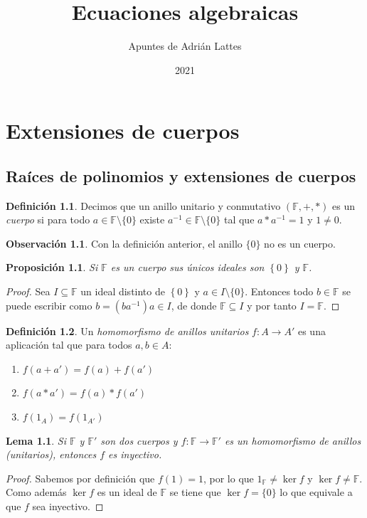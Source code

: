 \documentclass[10pt, spanish]{report}
\title{Ecuaciones algebraicas}
\author{Apuntes de Adrián Lattes}
\date{2021}
\newtheorem{lema}[tma]{Lema}
\newtheorem{prop}[tma]{Proposición}
\theoremstyle{definition}
\newtheorem*{defin}{Definición}
\newtheorem*{obs}{Observación}
\newcommand{\F}{\mathbb{F}}
\newcommand{\fecha}[1]{\marginpar{\underline{\footnotesize{#1}}}}
\begin{document}
\maketitle

\newpage
\hspace{0pt}

\chapter{Extensiones de cuerpos}
\fecha{15/02}
\section{Raíces de polinomios y extensiones de cuerpos}

\begin{defin}
    \label{def:cuerpo}
    Decimos que un anillo unitario y conmutativo $(\F,+,*)$ es un
    \textit{cuerpo} si para todo $a\in \F\setminus\{0\}$ existe $a^{-1}\in
    \F\setminus\{0\}$ tal que $a*a^{-1}=1$ y $1\neq 0$.
\end{defin}

\begin{obs}
    Con la definición anterior, el anillo $\{0\}$ no es un cuerpo.
\end{obs}

\begin{prop}
    Si $\F$ es un cuerpo sus únicos ideales son $\left\{ 0 \right\}$ y $\F$.
\end{prop}
\begin{proof}
    Sea $I\subseteq \F$ un ideal distinto de $\left\{ 0 \right\}$ y $a\in
    I\setminus\{0\}$. Entonces todo $b\in\F$ se puede escribir como
    $b=(ba^{-1})a\in I$, de donde $\F\subseteq I$ y por tanto $I=\F$.
\end{proof}

\begin{defin}
    Un \textit{homomorfismo de anillos unitarios} $f:A\to A'$ es una aplicación
    tal que para todos $a,b\in A$:
    \begin{enumerate}
        \item $f(a+a')=f(a)+f(a')$
        \item $f(a*a')=f(a)*f(a')$
        \item $f(1_A)=f(1_{A'})$
    \end{enumerate}
\end{defin}

\begin{lema}
    Si $\F$ y $\F'$ son dos cuerpos y $f: \F\to\F'$ es un homomorfismo de
    anillos (unitarios), entonces $f$ es inyectivo.
\end{lema}
\begin{proof}
    Sabemos por definición que $f(1)=1$, por lo que $1_\F\neq \ker{f}$ y
    $\ker{f}\neq \F$. Como además $\ker{f}$ es un ideal de $\F$ se tiene que
    $\ker{f}=\{0\}$ lo que equivale a que $f$ sea inyectivo.
\end{proof}
\end{document}
